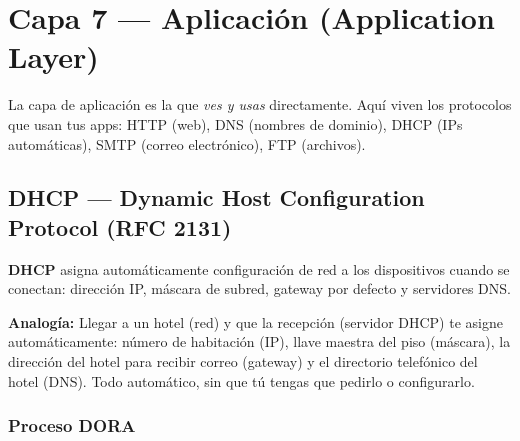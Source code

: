 \chapter{ Capa 7 --- Aplicación (Application Layer)}

\begin{concepto}
La capa de aplicación es la que \textit{ves y usas} directamente. Aquí viven
los protocolos que usan tus apps: HTTP (web), DNS (nombres de dominio),
DHCP (IPs automáticas), SMTP (correo electrónico), FTP (archivos).
\end{concepto}

\section{ DHCP --- Dynamic Host Configuration Protocol (RFC 2131)}

\begin{concepto}
\textbf{DHCP} asigna automáticamente configuración de red a los dispositivos
cuando se conectan: dirección IP, máscara de subred, gateway por defecto y
servidores DNS.

 \textbf{Analogía:} Llegar a un hotel (red) y que la recepción
(servidor DHCP) te asigne automáticamente: número de habitación (IP),
llave maestra del piso (máscara), la dirección del hotel para recibir correo
(gateway) y el directorio telefónico del hotel (DNS). Todo automático, sin
que tú tengas que pedirlo o configurarlo.
\end{concepto}

\subsection{Proceso DORA}

